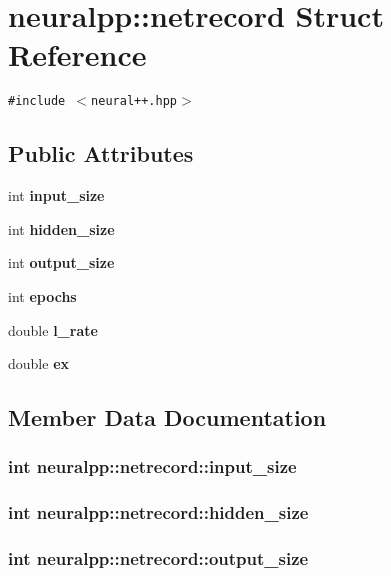 \section{neuralpp::netrecord Struct Reference}
\label{structneuralpp_1_1netrecord}
{\tt \#include $<$neural++.hpp$>$}

\subsection*{Public Attributes}
\begin{CompactItemize}
\item 
int {\bf input\_\-size}
\item 
int {\bf hidden\_\-size}
\item 
int {\bf output\_\-size}
\item 
int {\bf epochs}
\item 
double {\bf l\_\-rate}
\item 
double {\bf ex}
\end{CompactItemize}


\subsection{Member Data Documentation}
\subsubsection[input\_\-size]{\setlength{\rightskip}{0pt plus 5cm}int {\bf neuralpp::netrecord::input\_\-size}}\label{structneuralpp_1_1netrecord_e1f480bfef05033accef40f77c09fa87}


\subsubsection[hidden\_\-size]{\setlength{\rightskip}{0pt plus 5cm}int {\bf neuralpp::netrecord::hidden\_\-size}}\label{structneuralpp_1_1netrecord_3c1728ac66c37f6ac85c404d4f55552e}


\subsubsection[output\_\-size]{\setlength{\rightskip}{0pt plus 5cm}int {\bf neuralpp::netrecord::output\_\-size}}\label{structneuralpp_1_1netrecord_95f2b0651dd3a0e5e7201ff354e401b4}


